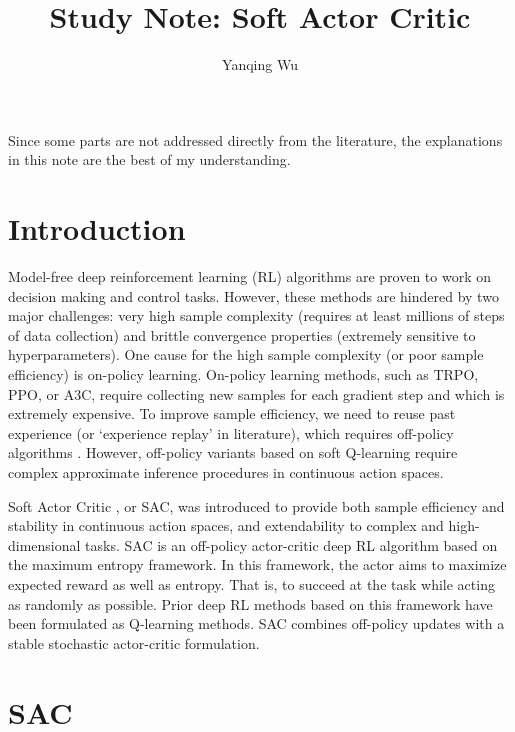 \documentclass[lang=en,mode=normal,device=normal,color=blue,12pt]{elegantnote}
\title{Study Note: Soft Actor Critic}
\author{Yanqing Wu}
\institute{Viwistar Robotics}
\DeclareMathOperator*{\1}{\mathbbm{1}}
\begin{document}
\maketitle

\newpage

Since some parts are not addressed directly from the literature, the explanations in this note are the best of my understanding.


\section{Introduction}


Model-free deep reinforcement learning (RL) algorithms are proven to work on decision making and control tasks. However, these methods are hindered by two major challenges: very high sample complexity (requires at least millions of steps of data collection) and brittle convergence properties (extremely sensitive to hyperparameters).
One cause for the high sample complexity (or poor sample efficiency) is on-policy learning. On-policy learning methods, such as TRPO, PPO, or A3C, require collecting new samples for each gradient step and which is extremely expensive.
To improve sample efficiency, we need to reuse past experience (or `experience replay' in literature), which requires off-policy algorithms  \cite{mnih2013playing}. However, off-policy variants based on soft Q-learning require complex approximate inference procedures in continuous action spaces. 


Soft Actor Critic \cite{haarnoja2018soft}, or SAC, was introduced to provide both sample efficiency and stability in continuous action spaces, and extendability to complex and high-dimensional tasks. SAC is an off-policy actor-critic deep RL algorithm based on the maximum entropy framework. In this framework, the actor aims to maximize expected reward as well as entropy. That is, to succeed at the task while acting as randomly as possible. Prior deep RL methods based on this framework have been formulated as Q-learning methods. SAC combines off-policy updates with a stable stochastic actor-critic formulation.


\section{SAC}
%
%
\end{document}
